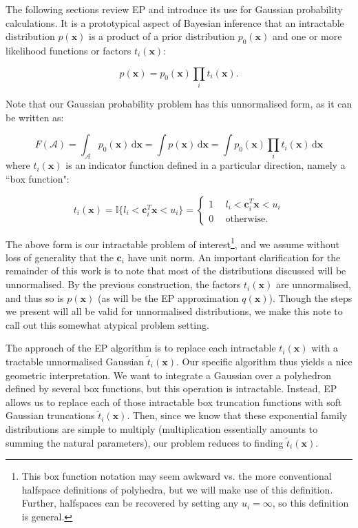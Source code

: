 \documentclass[twoside,11pt]{article}
\newcommand{\II}{\mathbb{I}}
\def\x{{\mathbf x}}
\def\c{{\mathbf c}}
\def\regionA{\mathcal{A}}
\renewcommand{\d}{\,\mathrm{d}}
\begin{document}
The following sections review EP and introduce its use for Gaussian probability calculations.  It is a prototypical aspect of Bayesian inference that an intractable distribution $p(\x)$ is a product of a prior distribution $p_0(\x)$ and one or more likelihood functions or factors $t_i(\x)$: 

\begin{equation}
  \label{eq:2}
  p(\x) = p_0(\x) \prod_i t_i(\x).
\end{equation}

\noindent Note that our Gaussian probability problem has this unnormalised form, as it can be written as: 

\begin{equation}
  \label{eqn:cumdensityEP}
  F(\regionA) = \int_\regionA p_0(\x)\d\x = \int p(\x)\d\x = \int p_0(\x) \prod_i t_i(\x) \d\x
\end{equation}
where $t_i(\x)$ is an indicator function defined in a particular direction, namely a ``box function":

\begin{equation}
\label{eqn:truefactor}
t_i(\x)  =  \II \bigl\{ l_i < \c_i^T\x < u_i \bigr\} = 
\begin{cases}
1 & ~~ l_i < \c_i^T\x < u_i \\
0 & ~~ \mathrm{otherwise}. 
\end{cases}
 \end{equation}

The above form is our intractable problem of interest\footnote{This box function notation may seem awkward vs. the more conventional halfspace definitions of polyhedra, but we will make use of this definition.  Further, halfspaces can be recovered by setting any $u_i = \infty$, so this definition is general.}, and we assume without loss of generality that the $\c_i$ have unit norm.  An important clarification for the remainder of this work is to note that most of the distributions discussed will be unnormalised.  By the previous construction, the factors $t_i(\x)$ are unnormalised, and thus so is $p(\x)$ (as will be the EP approximation $q(\x)$).  Though the steps we present will all be valid for unnormalised distributions, we make this note to call out this somewhat atypical problem setting.

   The approach of the EP algorithm is to replace each intractable $t_i(\x)$ with a tractable unnormalised Gaussian $\tilde{t}_i(\x)$.  Our specific algorithm thus yields a nice geometric interpretation.  We want to integrate a Gaussian over a polyhedron defined by several box functions, but this operation is intractable.  Instead, EP allows us to replace each of those intractable box truncation functions with soft Gaussian truncations $\tilde{t}_i(\x)$.   Then, since we know that these exponential family distributions are simple to multiply (multiplication essentially amounts to summing the natural parameters), our problem reduces to finding $\tilde{t}_i(\x)$.
\end{document}
